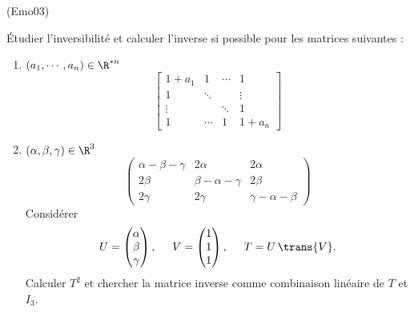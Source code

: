 \begin{tiny}(Emo03)\end{tiny}
\'Etudier l'inversibilit{\'e} et calculer l'inverse si possible pour les matrices suivantes :
\begin{enumerate}
\item $(a_{1},\cdots ,a_{n})\in \R^{*n}$%
\[
\left[
\begin{array}{cccc}
1+a_{1} & 1 & \cdots  & 1 \\
1 & \ddots  &  & \vdots  \\
\vdots  &  & \ddots  & 1 \\
1 & \cdots  & 1 & 1+a_{n}
\end{array}
\right]
\]

\item $(\alpha, \beta, \gamma)\in \R^3$
\begin{displaymath}
 \begin{pmatrix}
\alpha -\beta -\gamma  & 2\alpha  & 2\alpha  \\
2\beta  & \beta -\alpha -\gamma  & 2\beta  \\
2\gamma  & 2\gamma  & \gamma -\alpha -\beta  
 \end{pmatrix}
\end{displaymath}
Considérer
\begin{displaymath}
U=
\begin{pmatrix}
 \alpha  \\ \beta  \\ \gamma
\end{pmatrix}
,\hspace{0.5cm} 
V=
\begin{pmatrix}
1 \\ 1 \\ 1
\end{pmatrix}
,\hspace{0.5cm}
T = U\,\trans{V}.
\end{displaymath}
Calculer $T^2$ et chercher la matrice inverse comme combinaison linéaire de $T$ et $I_3$. 
\end{enumerate}
